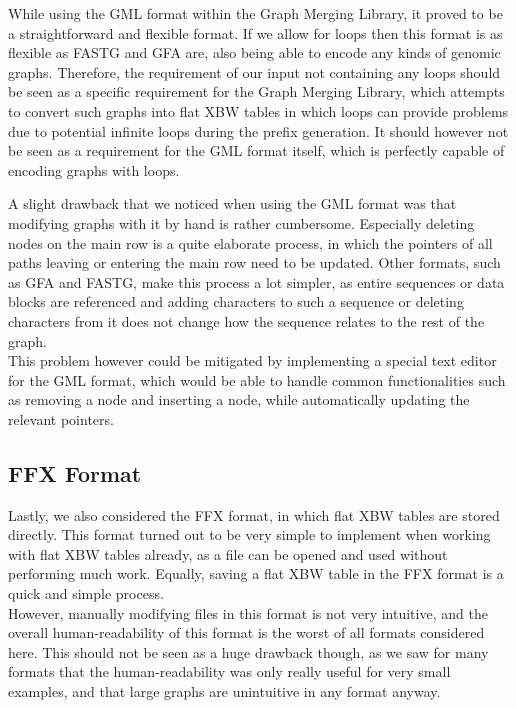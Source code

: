 \documentclass[a4paper,12pt,twoside,BCOR=10mm]{scrbook}
\begin{document}
While using the GML format within the Graph Merging Library, 
it proved to be a straightforward and flexible format. 
If we allow for loops then this format is as flexible as FASTG and GFA are, 
also being able to encode any kinds of genomic graphs. 
Therefore, the requirement of our input not containing any loops should be 
seen as a specific requirement for the Graph Merging Library, which attempts 
to convert such graphs into flat XBW tables in which loops can provide problems 
due to potential infinite loops during the prefix generation. 
It should however not be seen as a requirement for the GML format itself, 
which is perfectly capable of encoding graphs with loops.

A slight drawback that we noticed when using the GML format was that 
modifying graphs with it by hand is rather cumbersome. 
Especially deleting nodes on the main row is a quite elaborate process, 
in which the pointers of all paths leaving or entering the main row 
need to be updated. 
Other formats, such as GFA and FASTG, make this process a lot simpler, 
as entire sequences or data blocks are referenced and adding characters to such a 
sequence or deleting characters from it does not change how the sequence 
relates to the rest of the graph. \\
This problem however could be mitigated by implementing a special text editor 
for the GML format, which would be able to handle common functionalities such as 
removing a node and inserting a node, while automatically updating the relevant pointers.

\subsection{FFX Format}

Lastly, we also considered the FFX format, in which flat XBW tables are stored directly. 
This format turned out to be very simple to implement when working with flat XBW tables already, 
as a file can be opened and used without performing much work. Equally, saving a flat XBW table 
in the FFX format is a quick and simple process. \\
However, manually modifying files in this format is not very intuitive, 
and the overall human-readability of this format is the worst of all formats considered here. 
This should not be seen as a huge drawback though, as we saw for many formats that the human-readability was 
only really useful for very small examples, and that large graphs are unintuitive in any format anyway.
\end{document}
